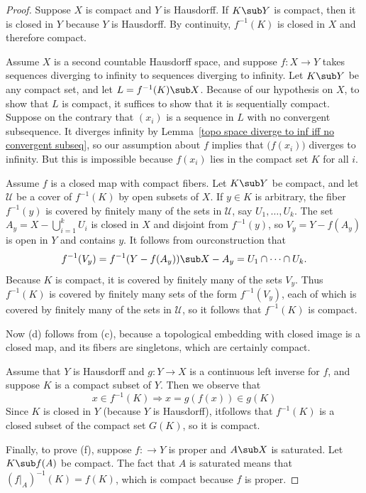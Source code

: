 \begin{proof}
Suppose $X$ is compact and $Y$ is Hausdorff. If $K\sub Y$ is
compact, then it is closed in $Y$ because $Y$ is Hausdorff. By continuity, $f^{-1}(K)$ is closed in $X$ and therefore compact.\par
Assume $X$ is a second countable Hausdorff space, and suppose
$f:X\to Y$ takes sequences diverging to infinity to sequences diverging to infinity. Let $K\sub Y$ be any compact set, and let $L=f^{-1}(K)\sub X$. Because of our hypothesis on $X$, to show that $L$ is compact, it suffices to show that it is sequentially compact. Suppose on the contrary that $(x_i)$ is a sequence in $L$ with no convergent subsequence. It diverges infinity by Lemma~\ref{topo space diverge to inf iff no convergent subseq}, so our assumption about $f$ implies that $\big(f(x_i)\big)$ diverges to infinity. But this is impossible because $f(x_i)$ lies in the compact set $K$ for all $i$.\par
Assume $f$ is a closed map with compact fibers. Let $K\sub Y$ be compact, and let $\mathcal{U}$ be a cover of $f^{-1}(K)$ by open subsets of $X$. If $y\in K$ is arbitrary, the fiber $f^{-1}(y)$ is covered by finitely many of the sets in $\mathcal{U}$, say $U_1,\dots,U_k$. The set $A_y=X-\bigcup_{i=1}^{k}U_i$ is closed in $X$ and disjoint from $f^{-1}(y)$, so $V_y=Y-f(A_y)$ is open in $Y$ and contains $y$. It follows from ourconstruction that 
\[f^{-1}(V_y)=f^{-1}(Y-f(A_y))\sub X-A_y=U_1\cap\cdots\cap U_k.\] 
Because $K$ is compact, it is covered by finitely many of the sets $V_y$. Thus $f^{-1}(K)$ is covered by finitely many sets of the form $f^{-1}(V_y)$, each of which is covered by finitely many of the sets in $\mathcal{U}$, so it follows that $f^{-1}(K)$ is compact.\par
Now (d) follows from (c), because a topological embedding with closed image is a closed map, and its fibers are singletons, which are certainly compact.\par
Assume that $Y$ is Hausdorff and $g:Y\to X$ is a continuous left inverse for $f$, and suppose $K$ is a compact subset of $Y$. Then we observe that
\[x\in f^{-1}(K)\Rightarrow x=g(f(x))\in g(K)\] 
Since $K$ is closed in $Y$ (because $Y$ is Hausdorff), itfollows that $f^{-1}(K)$ is a closed subset of the compact set $G(K)$, so it is compact.\par
Finally, to prove (f), suppose $f:\to Y$ is proper and $A\sub X$ is saturated. Let
$K\sub f(A)$ be compact. The fact that $A$ is saturated means that $(f|_A)^{-1}(K)=f(K)$, which is compact because $f$ is proper.
\end{proof}
